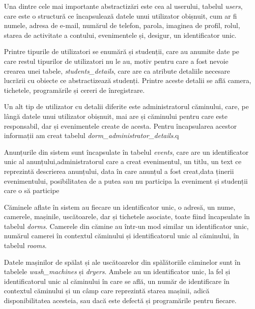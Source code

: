 \documentclass[12pt,a4paper]{report}
\theoremstyle{definition}
\theoremstyle{remark}
\begin{document}
\par Una dintre cele mai importante abstractizări este cea al userului, tabelul \textit{users}, care este o structură ce încapsulează datele unui utilizator obișnuit, cum ar fi numele, adresa de e-mail, numărul de telefon, parola, imaginea de profil, rolul, starea de activitate a contului, evenimentele și, desigur, un identificator unic.



\par Printre tipurile de utilizatori se enumără și studenții, care au anumite date pe care restul tipurilor de utilizatori nu le au, motiv pentru care a fost nevoie crearea unei tabele, \textit{students\_details}, care are ca atribute detaliile necesare lucrării cu obiecte ce abstractizează studenți. Printre aceste detalii se află camera, tichetele, programările și cereri de înregistrare.

\par Un alt tip de utilizator cu detalii diferite este administratorul căminului, care, pe lângă datele unui utilizator obișnuit, mai are și căminului pentru care este responsabil, dar și evenimentele create de acesta. Pentru încapsularea acestor informații am creat tabelul \textit{dorm\_administrator\_details}.q

\par Anunțurile din sistem sunt încapsulate în tabelul \textit{events}, care are un identificator unic al anunțului,administratorul care a creat evenimentul, un titlu, un text ce reprezintă descrierea anunțului, data în care anunțul a fost creat,data ținerii evenimentului, posibilitatea de a putea sau nu participa la eveniment și studenții care o să participe

\par Căminele aflate în sistem au fiecare un identificator unic, o adresă, un nume, camerele, mașinile, uscătoarele, dar și tichetele asociate, toate fiind încapsulate în tabelul \textit{dorms}. Camerele din cămine au într-un mod similar un identificator unic, numărul camerei în contextul căminului și identificatorul unic al căminului, în tabelul \textit{rooms}.

\par Datele mașinilor de spălat și ale uscătoarelor din spălătoriile căminelor sunt în tabelele \textit{wash\_machines} și \textit{dryers}. Ambele au un identificator unic, la fel și identificatorul unic al căminului în care se află, un număr de identificare în contextul căminului și un câmp care reprezintă starea mașinii, adică disponibilitatea acesteia, sau dacă este defectă și programările pentru fiecare.
\end{document}
